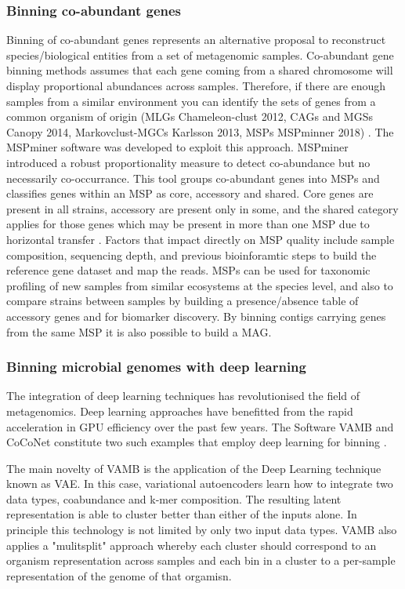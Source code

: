 \documentclass{article}
\begin{document}
\subsubsection{Binning co-abundant genes}
Binning of co-abundant genes represents an alternative proposal to reconstruct species/biological entities from a set of metagenomic samples.
Co-abundant gene binning methods assumes that each gene coming from a shared chromosome will display proportional abundances across samples.
Therefore, if there are enough samples from a similar environment you can identify the sets of genes from a common organism of origin (MLGs Chameleon-clust 2012, CAGs and MGSs Canopy 2014, Markovclust-MGCs Karlsson 2013, MSPs MSPminner 2018) \cite{karypis1999chameleon, plaza2019mspminer}.
The MSPminer software was developed to exploit this approach.
MSPminer introduced a robust proportionality measure to detect co-abundance but no necessarily co-occurrance.
This tool groups co-abundant genes into \glspl{MSP} and classifies genes within an MSP as core, accessory and shared.
Core genes are present in all strains, accessory are present only in some, and the shared category applies for those genes which may be present in more than one MSP due to horizontal transfer \cite{tettelin2005genome}.
Factors that impact directly on \gls{MSP} quality include sample composition, sequencing depth, and previous bioinforamtic steps to build the reference gene dataset and map the reads.
MSPs can be used for taxonomic profiling of new samples from similar ecosystems at the species level, and also to compare strains between samples by building a presence/absence table of accessory genes and for biomarker discovery.
By binning contigs carrying genes from the same MSP it is also possible to build a \gls{MAG}.

\subsubsection{Binning microbial genomes with deep learning}
The integration of deep learning techniques has revolutionised the field of metagenomics.
Deep learning approaches have benefitted from the rapid acceleration in GPU efficiency over the past few years.
The Software VAMB and CoCoNet constitute two such examples that employ deep learning for binning \cite{nissenimproved, arisdakessian2021coconet}.

The main novelty of VAMB is the application of the Deep Learning technique known as \gls{VAE}.
In this case, variational autoencoders learn how to integrate two data types, coabundance and k-mer composition.
The resulting latent representation is able to cluster better than either of the inputs alone.
In principle this technology is not limited by only two input data types.
VAMB also applies a "mulitsplit" approach whereby each cluster should correspond to an organism representation across samples and each bin in a cluster to a per-sample representation of the genome of that orgamisn.
\end{document}
